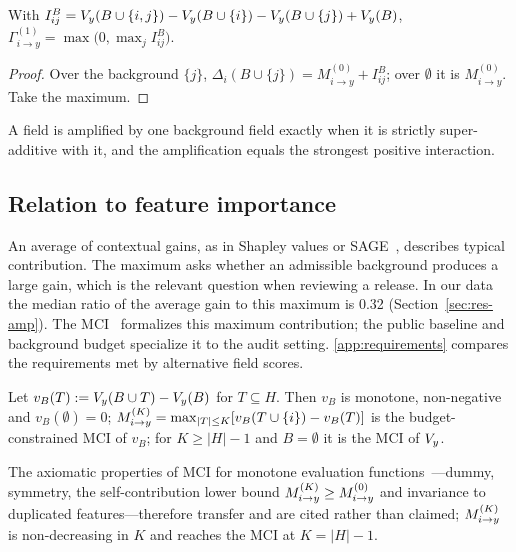\begin{proposition}[Amplification at $K=1$]\label{prop:k1}
With $I^B_{ij}=V_y(B\cup\{i,j\})-V_y(B\cup\{i\})-V_y(B\cup\{j\})+V_y(B)$,
$\Gamma^{(1)}_{i\to y}=\max\big(0,\max_{j} I^{B}_{ij}\big)$.
\end{proposition}
\begin{proof}
Over the background $\{j\}$, $\Delta_i(B\cup\{j\})=M^{(0)}_{i\to y}+I^B_{ij}$; over $\emptyset$ it is
$M^{(0)}_{i\to y}$. Take the maximum.
\end{proof}
A field is amplified by one background field exactly when it is strictly super-additive with it,
and the amplification equals the strongest positive interaction.

\subsection{Relation to feature importance}
An average of contextual gains, as in Shapley values or SAGE~\cite{covert2020sage}, describes typical contribution. The maximum asks whether an admissible background produces a large gain, which is the relevant question when reviewing a release. In our data the median ratio of the average gain to this maximum is 0.32 (Section~\ref{sec:res-amp}). The MCI~\cite{catav2021mci} formalizes this maximum contribution; the public baseline and background budget specialize it to the audit setting. \ref{app:requirements} compares the requirements met by alternative field scores.

\begin{proposition}\label{prop:mci}
Let $v_B(T) := V_y(B \cup T) - V_y(B)$ for $T \subseteq H$. Then $v_B$ is monotone,
non-negative and $v_B(\emptyset)=0$; $M^{(K)}_{i\to y} = \max_{|T|\le K}[v_B(T\cup\{i\}) - v_B(T)]$ is the
budget-constrained MCI of $v_B$; for $K \ge |H|-1$ and $B=\emptyset$ it is the MCI of $V_y$.
\end{proposition}
The axiomatic properties of MCI for monotone evaluation functions~\cite{catav2021mci}---dummy,
symmetry, the self-contribution lower bound $M^{(K)}_{i\to y}\ge M^{(0)}_{i\to y}$ and invariance to
duplicated features---therefore transfer and are cited rather than claimed; $M^{(K)}_{i\to y}$ is
non-decreasing in $K$ and reaches the MCI at $K=|H|-1$.

